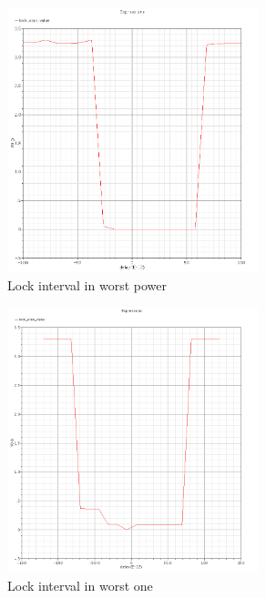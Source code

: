 \documentclass[a4paper,12pt]{article} \usepackage{graphicx}
\begin{document}
\begin{figure}[h]
  \centering
  \includegraphics[width=0.65\textwidth]{../Bilder/LD_tran/LD_lsim_wp.png}
  \caption{Lock interval in worst power}
  \label{fig:LDwp}
\end{figure}

\begin{figure}[h]
  \centering
  \includegraphics[width=0.65\textwidth]{../Bilder/LD_tran/LD_lsim_wo.png}
  \caption{Lock interval in worst one}
  \label{fig:LDwo}
\end{figure}
\end{document}

